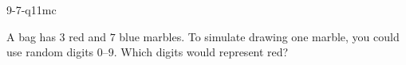 \begin{practiceQuestion}{9-7-q11}{mc}
\begin{questionText}
A bag has $3$ red and $7$ blue marbles. To simulate drawing one marble, you could use random digits $0$--$9$. Which digits would represent red?
\end{questionText}
\end{practiceQuestion}
